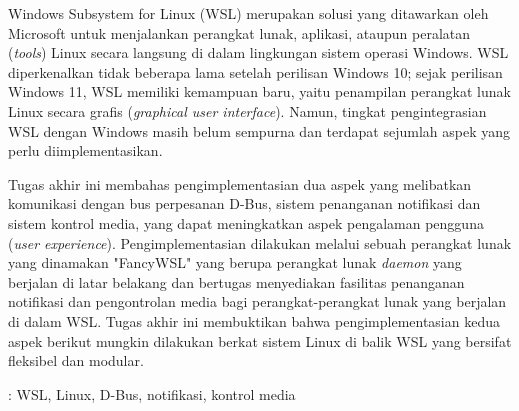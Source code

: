 Windows Subsystem for Linux (WSL) merupakan solusi yang ditawarkan oleh Microsoft untuk menjalankan perangkat lunak, aplikasi, ataupun peralatan (\textit{tools}) Linux secara langsung di dalam lingkungan sistem operasi Windows. WSL diperkenalkan tidak beberapa lama setelah perilisan Windows 10; sejak perilisan Windows 11, WSL memiliki kemampuan baru, yaitu penampilan perangkat lunak Linux secara grafis (\textit{graphical user interface}). Namun, tingkat pengintegrasian WSL dengan Windows masih belum sempurna dan terdapat sejumlah aspek yang perlu diimplementasikan.

Tugas akhir ini membahas pengimplementasian dua aspek yang melibatkan komunikasi dengan bus perpesanan D-Bus, sistem penanganan notifikasi dan sistem kontrol media, yang dapat meningkatkan aspek pengalaman pengguna (\textit{user experience}). Pengimplementasian dilakukan melalui sebuah perangkat lunak yang dinamakan "FancyWSL" yang berupa perangkat lunak \textit{daemon} yang berjalan di latar belakang dan bertugas menyediakan fasilitas penanganan notifikasi dan pengontrolan media bagi perangkat-perangkat lunak yang berjalan di dalam WSL. Tugas akhir ini membuktikan bahwa pengimplementasian kedua aspek berikut mungkin dilakukan berkat sistem Linux di balik WSL yang bersifat fleksibel dan modular.

 : WSL, Linux, D-Bus, notifikasi, kontrol media
